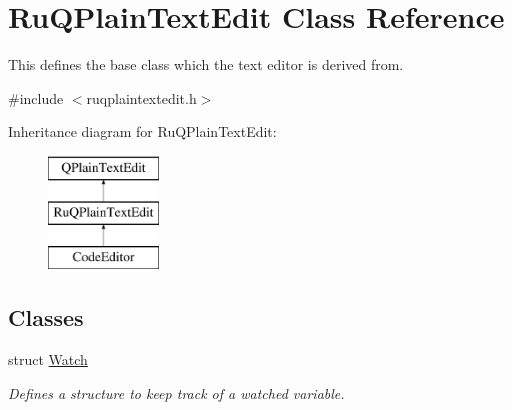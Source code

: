 \hypertarget{class_ru_q_plain_text_edit}{}\section{Ru\+Q\+Plain\+Text\+Edit Class Reference}
\label{class_ru_q_plain_text_edit}


This defines the base class which the text editor is derived from.  




{\ttfamily \#include $<$ruqplaintextedit.\+h$>$}

Inheritance diagram for Ru\+Q\+Plain\+Text\+Edit\+:\begin{figure}[H]
\begin{center}
\leavevmode
\includegraphics[height=3.000000cm]{class_ru_q_plain_text_edit}
\end{center}
\end{figure}
\subsection*{Classes}
\begin{DoxyCompactItemize}
\item 
struct \hyperlink{struct_ru_q_plain_text_edit_1_1_watch}{Watch}
\begin{DoxyCompactList}\small\item\em Defines a structure to keep track of a watched variable. \end{DoxyCompactList}\end{DoxyCompactItemize}
